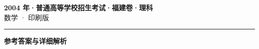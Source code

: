 \documentclass[zihao=5, a4paper]{ctexart}
\begin{document}
\begin{center}
  {\Large\bfseries 2004 年·普通高等学校招生考试·福建卷·理科}\\[4pt]
  {\large 数学 · 印刷版}
\end{center}
\medskip
{}

\par\bigskip\hrule\bigskip
{}
\begin{center}{\large\bfseries 参考答案与详细解析}\end{center}
\smallskip

\end{document}
